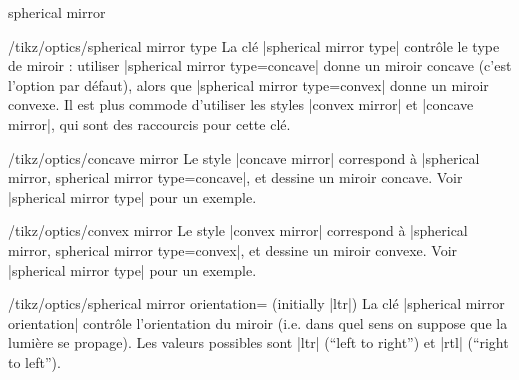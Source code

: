 \documentclass[a4paper]{ltxdoc}
\begin{document}
\begin{shape}{spherical mirror}
\begin{key}{/tikz/optics/spherical mirror type}
    La clé |spherical mirror type| contrôle le type de miroir : utiliser |spherical mirror type=concave| donne un miroir concave (c'est l'option par défaut), alors que |spherical mirror type=convex| donne un miroir convexe.
    Il est plus commode d'utiliser les styles |convex mirror| et |concave mirror|, qui sont des raccourcis pour cette clé.

\begin{codeexample}[width=5cm]
\end{codeexample}
\end{key}

\begin{stylekey}{/tikz/optics/concave mirror}
    Le style |concave mirror| correspond à |spherical mirror, spherical mirror type=concave|, et dessine un miroir concave. Voir |spherical mirror type| pour un exemple.
\end{stylekey}

\begin{stylekey}{/tikz/optics/convex mirror}
    Le style |convex mirror| correspond à |spherical mirror, spherical mirror type=convex|, et dessine un miroir convexe. Voir |spherical mirror type| pour un exemple.
\end{stylekey}


\begin{key}{/tikz/optics/spherical mirror orientation= (initially |ltr|)}
    La clé |spherical mirror orientation| contrôle l'orientation du miroir (i.e. dans quel sens on suppose que la lumière se propage). Les valeurs possibles sont |ltr| (\enquote{left to right}) et |rtl| (\enquote{right to left}).

\begin{codeexample}[width=5cm]
\end{codeexample}
\end{key}


\end{shape}
\end{document}
